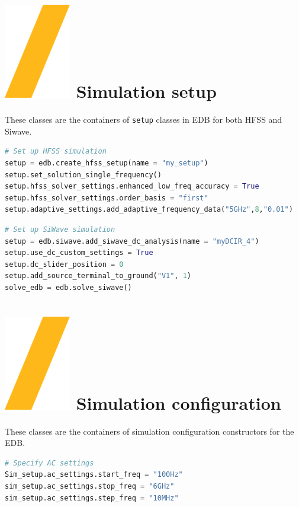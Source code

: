 \documentclass[landscape]{article}
\begin{document}
\begin{multicols}{3}
\begin{lstlisting}[language=Python]
\end{lstlisting}

\section{\includegraphics[height=\fontcharht\font`\S]{slash.png} Simulation setup}
These classes are the containers of \texttt{setup} classes in EDB for both HFSS and Siwave.
\begin{lstlisting}[language=Python]
# Set up HFSS simulation
setup = edb.create_hfss_setup(name = "my_setup")
setup.set_solution_single_frequency()
setup.hfss_solver_settings.enhanced_low_freq_accuracy = True
setup.hfss_solver_settings.order_basis = "first"
setup.adaptive_settings.add_adaptive_frequency_data("5GHz",8,"0.01")
\end{lstlisting}

\begin{lstlisting}[language=Python]
# Set up SiWave simulation
setup = edb.siwave.add_siwave_dc_analysis(name = "myDCIR_4")
setup.use_dc_custom_settings = True
setup.dc_slider_position = 0
setup.add_source_terminal_to_ground("V1", 1)
solve_edb = edb.solve_siwave()
\end{lstlisting}
\section{\includegraphics[height=\fontcharht\font`\S]{slash.png} Simulation configuration}
These classes are the containers of simulation configuration constructors for the EDB.
\begin{lstlisting}[language=Python]
# Specify AC settings
Sim_setup.ac_settings.start_freq = "100Hz"
sim_setup.ac_settings.stop_freq = "6GHz"
sim_setup.ac_settings.step_freq = "10MHz"


\end{lstlisting}
\end{multicols}
\end{document}

